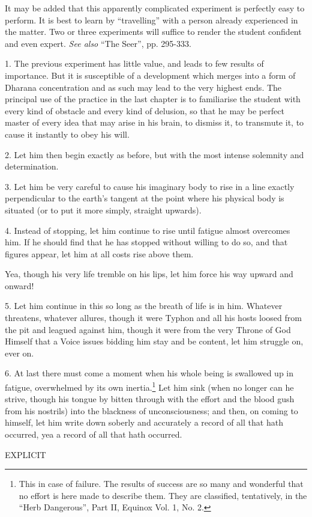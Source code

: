 It may be added that this apparently complicated experiment is perfectly easy to perform. It is best to learn by \enquote{travelling} with a person already experienced in the matter. Two or three experiments will suffice to render the student confident and even expert. \textit{See also} \enquote{The Seer}, pp. 295-333.




1. The previous experiment has little value, and leads to few results of importance. But it is susceptible of a development which merges into a form of Dharana \textemdash{} concentration \textemdash{} and as such may lead to the very highest ends. The principal use of the practice in the last chapter is to familiarise the student with every kind of obstacle and every kind of delusion, so that he may be perfect master of every idea that may arise in his brain, to dismiss it, to transmute it, to cause it instantly to obey his will.

2. Let him then begin exactly as before, but with the most intense solemnity and determination.

3. Let him be very careful to cause his imaginary body to rise in a line exactly perpendicular to the earth's tangent at the point where his physical body is situated (or to put it more simply, straight upwards).

4. Instead of stopping, let him continue to rise until fatigue almost overcomes him. If he should find that he has stopped without willing to do so, and that figures appear, let him at all costs rise above them.

Yea, though his very life tremble on his lips, let him force his way upward and onward!

5. Let him continue in this so long as the breath of life is in him. Whatever threatens, whatever allures, though it were Typhon and all his hosts loosed from the pit and leagued against him, though it were from the very Throne of God Himself that a Voice issues bidding him stay and be content, let him struggle on, ever on.

6. At last there must come a moment when his whole being is swallowed up in fatigue, overwhelmed by its own inertia.\footnote{This in case of failure. The results of success are so many and wonderful that no effort is here made to describe them. They are classified, tentatively, in the \enquote{Herb Dangerous}, Part II, Equinox Vol. 1, No. 2.} Let him sink (when no longer can he strive, though his tongue by bitten through with the effort and the blood gush from his nostrils) into the blackness of unconsciousness; and then, on coming to himself, let him write down soberly and accurately a record of all that hath occurred, yea a record of all that hath occurred.

{
\centering

\textsc{EXPLICIT}
\par
}

